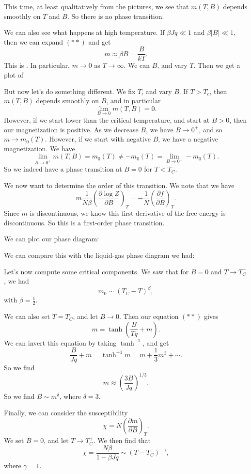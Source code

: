 \documentclass[a4paper]{article}
\begin{document}
This time, at least qualitatively from the pictures, we see that $m(T, B)$ depends smoothly on $T$ and $B$. So there is no phase transition.

We can also see what happens at high temperature. If $\beta J q \ll 1$ and $\beta |B| \ll 1$, then we can expand $(**)$ and get
\[
  m \approx \beta B = \frac{B}{kT}.
\]
This is . In particular, $m \to 0$ as $T \to \infty$. We can $B$, and vary $T$. Then we get a plot of


But now let's do something different. We fix $T$, and vary $B$. If $T > T_c$, then $m(T, B)$ depends smoothly on $B$, and in particular
\[
  \lim_{B \to 0} m(T, B) = 0.
\]
However, if we start lower than the critical temperature, and start at $B > 0$, then our magnetization is positive. As we decrease $B$, we have $B \to 0^+$, and so $m \to m_0(T)$. However, if we start with negative $B$, we have a negative magnetization. We have
\[
  \lim_{B \to 0^+} m(T, B) = m_0(T) \not= - m_0(T) = \lim_{B \to 0^-} -m_0(T).
\]
So we indeed have a phase transition at $B = 0$ for $T < T_C$.

We now want to determine the order of this transition. We note that we have
\[
  m \frac{1}{N\beta}\left(\frac{\partial \log Z}{\partial B}\right)_T = - \frac{1}{N} \left(\frac{\partial f}{\partial B}\right)_T.
\]
Since $m$ is discontinuous, we know this first derivative of the free energy is discontinuous. So this is a first-order phase transition.

We can plot our phase diagram:


We can compare this with the liquid-gas phase diagram we had:


Let's now compute some critical components. We saw that for $B = 0$ and $T \to T_C^-$, we had
\[
  m_0 \sim (T_C - T)^\beta,
\]
with $\beta = \frac{1}{2}$.

We can also set $T = T_C$, and let $B \to 0$. Then our equation $(**)$ gives
\[
  m = \tanh\left(\frac{B}{Tq} + m\right).
\]
We can invert this equation by taking $\tanh^{-1}$, and get
\[
  \frac{B}{Jq} + m = \tanh^{-1} m = m + \frac{1}{3} m^3 + \cdots.
\]
So we find
\[
  m \approx \left(\frac{3B}{Jq}\right)^{1/3}.
\]
So we find $B \sim m^\delta$, where $\delta = 3$.

Finally, we can consider the susceptibility
\[
  \chi = N \left(\frac{\partial m}{\partial B}\right)_T.
\]
We set $B = 0$, and let $T \to T_C^+$. We then find that
\[
  \chi = \frac{N \beta}{1 - \beta J q} \sim (T - T_C)^{-\gamma},
\]
where $\gamma = 1$.
\end{document}
